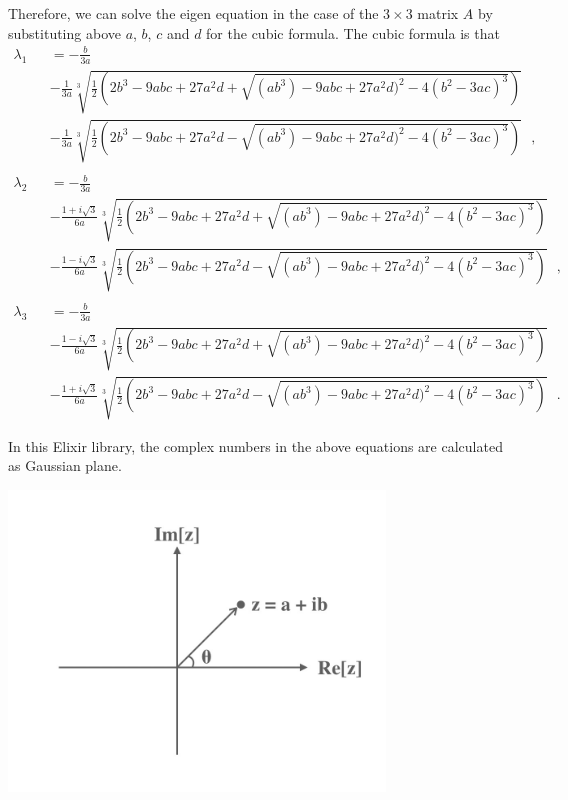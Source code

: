 \documentclass[dvipdfmx]{article}
\begin{document}
Therefore, 
we can solve the eigen equation in the case of the $3{\times}3$ matrix $A$ by substituting above $a$, $b$, $c$ and $d$ for the cubic formula.
The cubic formula is that 
\begin{eqnarray}
{\lambda}_1 &&= -\frac{b}{3a} \nonumber \\
       &&- \frac{1}{3a} \sqrt[3]{ \frac{1}{2} (2b^3 -9abc + 27a^2d + \sqrt{(ab^3) - 9abc + 27a^2d)^2 - 4(b^2 - 3ac)^3} ) } \nonumber \\  
       &&- \frac{1}{3a} \sqrt[3]{ \frac{1}{2} (2b^3 -9abc + 27a^2d - \sqrt{(ab^3) - 9abc + 27a^2d)^2 - 4(b^2 - 3ac)^3} ) } \ \ \ , \nonumber \\ 
\nonumber \\
{\lambda}_2 &&= -\frac{b}{3a} \nonumber \\
       &&- \frac{1 + i \sqrt{3}}{6a} \sqrt[3]{ \frac{1}{2} (2b^3 -9abc + 27a^2d + \sqrt{(ab^3) - 9abc + 27a^2d)^2 - 4(b^2 - 3ac)^3} ) } \nonumber \\  
       &&- \frac{1 - i \sqrt{3}}{6a} \sqrt[3]{ \frac{1}{2} (2b^3 -9abc + 27a^2d - \sqrt{(ab^3) - 9abc + 27a^2d)^2 - 4(b^2 - 3ac)^3} ) } \ \ \ , \nonumber \\ 
\nonumber \\
{\lambda}_3 &&= -\frac{b}{3a} \nonumber \\
       &&- \frac{1 - i \sqrt{3}}{6a} \sqrt[3]{ \frac{1}{2} (2b^3 -9abc + 27a^2d + \sqrt{(ab^3) - 9abc + 27a^2d)^2 - 4(b^2 - 3ac)^3} ) } \nonumber \\  
       &&- \frac{1 + i \sqrt{3}}{6a} \sqrt[3]{ \frac{1}{2} (2b^3 -9abc + 27a^2d - \sqrt{(ab^3) - 9abc + 27a^2d)^2 - 4(b^2 - 3ac)^3} ) } \ \ \ . \nonumber 
\end{eqnarray}
 
In this Elixir library, the complex numbers in the above equations are calculated as Gaussian plane.
\begin{center}
  \includegraphics[width=10cm]{gaussian_plane.jpg}
\end{center}
\end{document}
